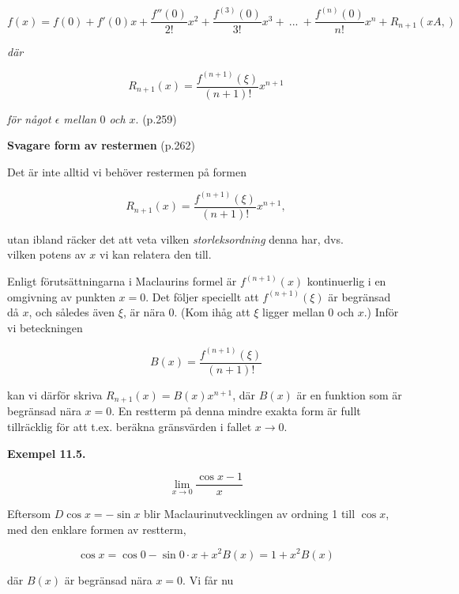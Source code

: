 \documentclass[11pt]{article}
\begin{document}
\begin{equation}
    f(x) = f(0) + f'(0)x + \frac{f''(0)}{2!}x^2 + \frac{f^{(3)}(0)}{3!}x^3 +\ ...\ + \frac{f^{(n)}(0)}{n!}x^n + R_{n + 1}(xA,)
    \label{eq:maclaurinpolynom_och_rest}
\end{equation}

\textit{där}


\begin{equation}
    R_{n + 1}(x) = \frac{f^{(n + 1)}(\xi)}{(n +  1)!}x^{n + 1}
    \label{eq:maclaurinpolynom_rest}
\end{equation}

\textit{för något $\epsilon$ mellan $0$ och $x$}. (p.259)

\textbf{Svagare form av restermen} (p.262)

Det är inte alltid vi behöver restermen på formen

\begin{equation}
    R_{n + 1}(x) = \frac{f^{(n + 1)}(\xi)}{(n + 1)!}x^{n + 1},
\end{equation}

utan ibland räcker det att veta vilken \textit{storleksordning} denna har, dvs.\\ vilken potens av $x$ vi kan relatera den till.

Enligt förutsättningarna i Maclaurins formel är $f^{(n + 1)}(x)$ kontinuerlig i en omgivning av punkten $x = 0$. Det följer speciellt att $f^{(n + 1)}(\xi)$ är begränsad då $x$, och således även $\xi$, är nära 0. (Kom ihåg att $\xi$ ligger mellan $0$ och $x$.) Inför vi beteckningen

\begin{equation}
    B(x) = \frac{f^{(n + 1)}(\xi)}{(n + 1)!}
\end{equation}

kan vi därför skriva $R_{n + 1}(x) = B(x)x^{n + 1}$, där $B(x)$ är en funktion som är begränsad nära $x = 0$. En restterm på denna mindre exakta form är fullt tillräcklig för att t.ex. beräkna gränsvärden i fallet $x \to 0$.


\textbf{Exempel 11.5.}

\[
    \lim_{x \to 0} \frac{\cos x - 1}{x}
\]

Eftersom $D \cos x = -\sin x$ blir Maclaurinutvecklingen av ordning 1 till $\cos x$, med den enklare formen av restterm,

\[
    \cos x = \cos 0 - \sin 0 \cdot x + x^2 B(x) = 1 + x^2B(x)
\]

där $B(x)$ är begränsad nära $x = 0$. Vi får nu
\end{document}
